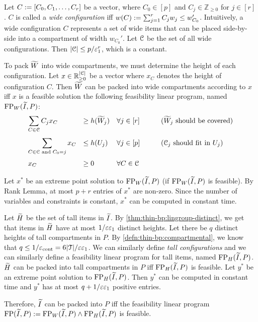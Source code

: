 Let $C := [C_0, C_1, \ldots, C_r]$ be a vector, where
$C_0 \in [p]$ and $C_j \in \mathbb{Z}_{\ge 0}$ for $j \in [r]$.
$C$ is called a \emph{wide configuration} iff
$w(C) := \sum_{j=1}^r C_jw_j \le w_{C_0}'$.
Intuitively, a wide configuration $C$ represents a set of wide items that can be placed
side-by-side into a compartment of width $w_{C_0}'$.
Let $\mathcal{C}$ be the set of all wide configurations.
Then $|\mathcal{C}| \le p/\varepsilon_1^r$, which is a constant.

To pack $\widetilde{W}$ into wide compartments,
we must determine the height of each configuration.
Let $x \in \mathbb{R}_{\ge 0}^{|\mathcal{C}|}$ be a vector where
$x_C$ denotes the height of configuration $C$.
Then $\widetilde{W}$ can be packed into wide compartments according to $x$ iff
$x$ is a feasible solution the following feasibility linear program,
named $\operatorname{FP}_W(\widetilde{I}, P)$:
\[ \begin{array}{*4{>{\displaystyle}l}}
\sum_{C \in \Ccal} C_jx_C &\ge h(\Wtild_j)
    & \forall j \in [r]
    & \qquad\textrm{($\Wtild_j$ should be covered)}
\\[1.75em] \sum_{C \in \Ccal \textrm{ and } C_0 = j} x_C &\le h(U_j)
    & \forall j \in [p]
    & \qquad\textrm{($\Ccal_j$ should fit in $U_j$)}
\\[1.75em] x_C &\ge 0 & \forall C \in \Ccal
\end{array} \]

Let $x^*$ be an extreme point solution to $\operatorname{FP}_W(\widetilde{I}, P)$
(if $\operatorname{FP}_W(\widetilde{I}, P)$ is feasible).
By Rank Lemma, at most $p+r$ entries of $x^*$ are non-zero.
Since the number of variables and constraints is constant,
$x^*$ can be computed in constant time.

Let $\widetilde{H}$ be the set of tall items in $\widetilde{I}$.
By \cref{thm:thin-bp:lingroup-distinct}, we get that items in $\widetilde{H}$
have at most $1/\varepsilon\varepsilon_1$ distinct heights.
Let there be $q$ distinct heights of tall compartments in $P$.
By \cref{defn:thin-bp:compartmental}, we know that $q \le 1/\varepsilon_{\mathrm{cont}} = 6|\mathcal{T}|/\varepsilon\varepsilon_1$.
We can similarly define \emph{tall configurations} and we can similarly define
a feasibility linear program for tall items, named $\operatorname{FP}_H(\widetilde{I}, P)$.
$\widetilde{H}$ can be packed into tall compartments in $P$ iff $\operatorname{FP}_H(\widetilde{I}, P)$ is feasible.
Let $y^*$ be an extreme point solution to $\operatorname{FP}_H(\widetilde{I}, P)$.
Then $y^*$ can be computed in constant time and
$y^*$ has at most $q + 1/\varepsilon\varepsilon_1$ positive entries.

Therefore, $\widetilde{I}$ can be packed into $P$ iff the feasibility linear program
$\operatorname{FP}(\widetilde{I}, P) := \operatorname{FP}_W(\widetilde{I}, P) \wedge \operatorname{FP}_H(\widetilde{I}, P)$ is feasible.

